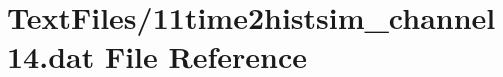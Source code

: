 \hypertarget{11time2histsim__channel14_8dat}{}\section{Text\+Files/11time2histsim\+\_\+channel14.dat File Reference}
\label{11time2histsim__channel14_8dat}
